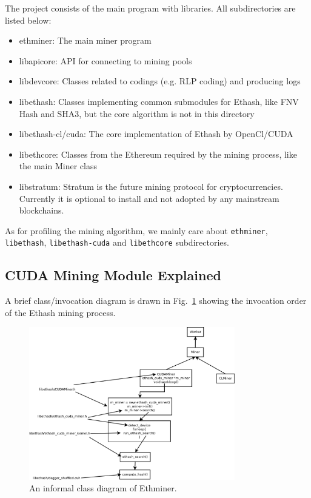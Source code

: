 \documentclass[11pt]{article}
\begin{document}
The project consists of the main program with libraries. All subdirectories are listed below:

\begin{itemize}
\item ethminer: The main miner program
\item libapicore: API for connecting to mining pools
\item libdevcore: Classes related to codings (e.g. RLP coding) and producing logs
\item libethash: Classes implementing common submodules for Ethash, like FNV Hash and SHA3, but the core algorithm is not in this directory
\item libethash-cl/cuda: The core implementation of Ethash by OpenCl/CUDA
\item libethcore: Classes from the Ethereum required by the mining process, like the main Miner class
\item libstratum: Stratum is the future mining protocol for cryptocurrencies. Currently it is optional to install and not adopted by any mainstream blockchains.
\end{itemize}

As for profiling the mining algorithm, we mainly care about \texttt{ethminer}, \texttt{libethash}, \texttt{libethash-cuda} and \texttt{libethcore} subdirectories.

\subsection{CUDA Mining Module Explained}

A brief class/invocation diagram is drawn in Fig.~\ref{fig:ethminer_ethash_classdiagram} showing the invocation order of the Ethash mining process.

\begin{figure}[h]
    \centering
    \includegraphics[width=0.8\textwidth]{ethminer_ethash_classdiagram.eps}
    \caption{An informal class diagram of Ethminer.}
    \label{fig:ethminer_ethash_classdiagram}
\end{figure}
\end{document}

